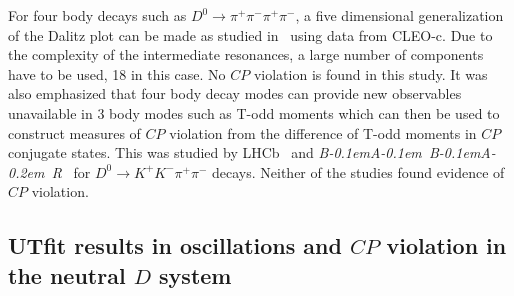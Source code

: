 \documentclass{PoS}
\def\babar{\mbox{\slshape B\kern-0.1em{\smaller A}\kern-0.1em
    B\kern-0.1em{\smaller A\kern-0.2em R}}}
\newcommand{\CP}{{\ensuremath{C\!P}}\xspace}
\begin{document}
For four body decays such as $D^0\to\pi^+\pi^-\pi^+\pi^-$, a five dimensional generalization of the Dalitz plot can be made as studied in~\cite{dArgent:2016rbp} using data from CLEO-c. Due to the complexity of the intermediate resonances, a large number of components have to be used, 18 in this case. No \CP violation is found in this study. It was also emphasized that four body decay modes can provide new observables unavailable in 3 body modes such as T-odd moments which can then be used to construct measures of \CP violation from the difference of T-odd moments in \CP conjugate states. This was studied by LHCb~\cite{Aaij:2014qwa} and \babar~\cite{delAmoSanchez:2010xj} for $D^0 \to K^+K^-\pi^+\pi^-$ decays. Neither of the studies found evidence of \CP violation.  

\subsection{UTfit results in oscillations and \CP violation in the neutral \boldmath  $D$ system}
\label{sec:pheno:utfit}
\end{document}
